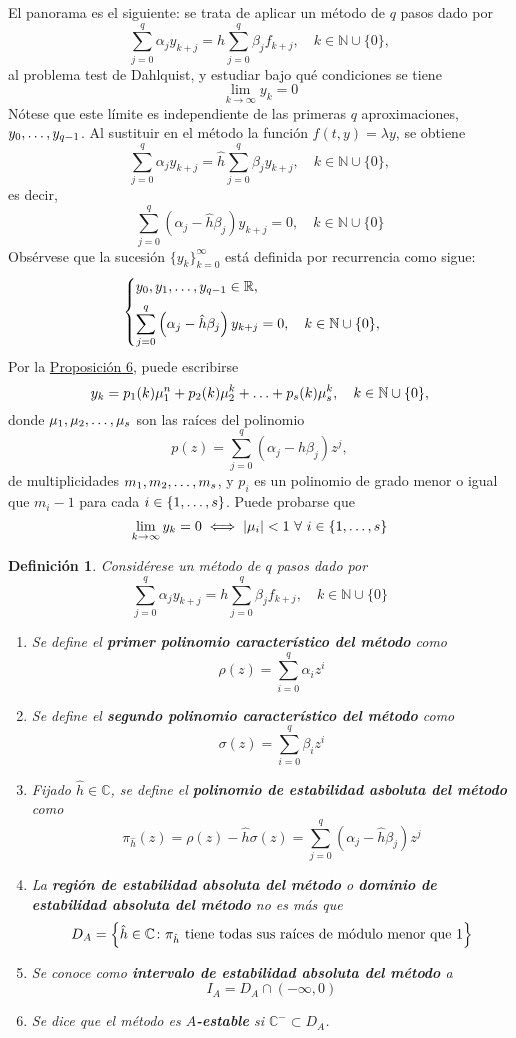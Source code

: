 \documentclass[11pt]{report}
\theoremstyle{mytheorem}
\theoremstyle{mydefinition}
\newtheorem{definition}{Definición}
\theoremstyle{myexample}
\newenvironment{cdefinition} %
  {\begin{mdframed}[
        linewidth=3pt,
        linecolor=c1,
        bottomline=false,
        topline=false,
        rightline=false,
        innerrightmargin=0pt,
        innertopmargin=0pt,
        innerbottommargin=0pt,
        innerleftmargin=1em, %
        skipabove=\baselineskip]
    \begin{definition}}
  {\end{definition}\end{mdframed}}
\newcommand{\R}{\mathbb R}
\newcommand{\N}{\mathbb N}
\newcommand{\C}{\mathbb C}
\newcommand{\mybf}[1]{\boldmath\textbf{\color{c1}#1}\unboldmath}
\begin{document}
El panorama es el siguiente: se trata de aplicar un método de $q$ pasos dado por
\[\sum_{j=0}^q \alpha_j y_{k+j} = h\sum_{j=0}^q \beta_j f_{k+j}, \quad k \in \N \cup \{0\},\]
al problema test de Dahlquist, y estudiar bajo qué condiciones se tiene
\[\lim_{k \to \infty} y_k =0\]
Nótese que este límite es independiente de las primeras $q$ aproximaciones, $y_0,\mathellipsis,y_{q-1}$. Al sustituir en el método la función $f(t,y) = \lambda y$, se obtiene
\[\sum_{j=0}^q \alpha_j y_{k+j} = \hat{h}\sum_{j=0}^q \beta_j y_{k+j}, \quad k \in \N \cup \{0\},\]
es decir,
\[\sum_{j=0}^q\left(\alpha_j-\hat{h}\beta_j\right)y_{k+j}= 0, \quad k \in \N \cup \{0\}\]
Obsérvese que la sucesión $\{y_k\}_{k=0}^\infty$ está definida por recurrencia como sigue:
\[\begin{cases}
    y_0,y_1,\mathellipsis,y_{q-1} \in \R, \\[5pt]
    \displaystyle \sum_{j=0}^q\left(\alpha_j-\hat{h}\beta_j\right)y_{k+j}= 0,  \quad k \in \N \cup \{0\},
\end{cases}\]
Por la \hyperref[prop6]{\color{gray}Proposición 6}, puede escribirse
\[y_k = p_1(k)\mu_1^n+p_2(k)\mu_2^k+\mathellipsis+p_s(k)\mu_s^k, \quad k \in \N \cup \{0\},\]
donde $\mu_1,\mu_2,\mathellipsis,\mu_s$ son las raíces del polinomio
\[p(z) = \sum_{j=0}^q \left(\alpha_j-\hat{h}\beta_j\right)z^j,\]
de multiplicidades $m_1,m_2,\mathellipsis,m_s$, y $p_i$ es un polinomio de grado menor o igual que $m_i-1$ para cada $i \in \{1,\mathellipsis,s\}$. Puede probarse que
\[\lim_{k \to \infty} y_k = 0 \iff |\mu_i| < 1 \ \forall \ i \in \{1,\mathellipsis,s\}\]

\begin{cdefinition}
Considérese un método de $q$ pasos dado por
\[\sum_{j=0}^q \alpha_j y_{k+j} = h\sum_{j=0}^q \beta_j f_{k+j}, \quad k \in \N \cup \{0\}\]
\begin{enumerate}
    \item Se define el \mybf{primer polinomio característico del método} como
    \[\rho(z) = \sum_{i=0}^q \alpha_i z^i\]
    \item Se define el \mybf{segundo polinomio característico del método} como
    \[\sigma(z) = \sum_{i=0}^q \beta_i z^i\]
    \item Fijado $\hat{h} \in \C$, se define el \mybf{polinomio de estabilidad asboluta del método} como
    \[\pi_{\hat{h}}(z) = \rho(z)-\hat{h}\sigma(z) = \sum_{j=0}^q \left(\alpha_j-\hat{h}\beta_j\right)z^j\]
    \item La \mybf{región de estabilidad absoluta del método} o \mybf{dominio de estabilidad absoluta del método} no es más que
    \[D_A = \left\{\hat{h} \in \C \colon \pi_{\hat{h}} \textup{ tiene todas sus raíces de módulo menor que } 1\right\}\]
    \item Se conoce como \mybf{intervalo de estabilidad absoluta del método} a
    \[I_A = D_A \cap (-\infty,0)\]
    \item Se dice que el método es \mybf{$A$-estable} si $\C^- \subset D_A$.
\end{enumerate}
\end{cdefinition}
\end{document}
